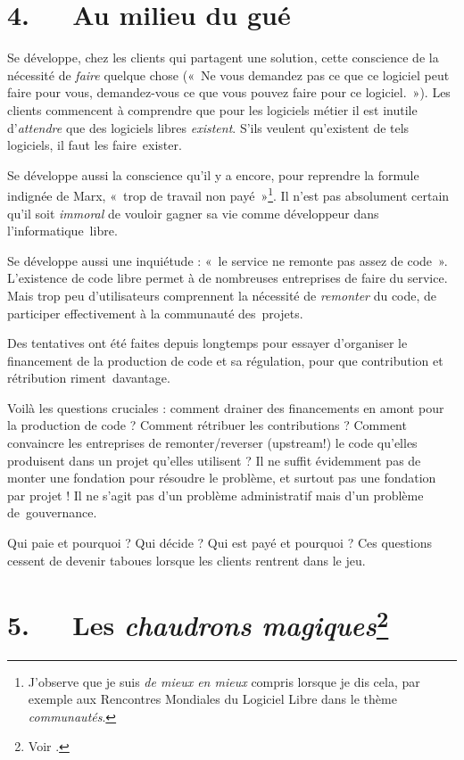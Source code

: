 \documentclass{FramateX}
\begin{document}
\begin{refsection}
\section*{4.~~~Au milieu du gué}
{}

Se développe, chez les clients qui partagent une solution, cette
conscience de la nécessité de \textit{faire} quelque chose («~Ne vous
demandez pas ce que ce logiciel peut faire pour vous, demandez-vous ce
que vous pouvez faire pour ce logiciel.~»). Les clients commencent à
comprendre que pour les logiciels métier il est inutile
d'\textit{attendre} que des logiciels libres \textit{existent}. S'ils
veulent qu'existent de tels logiciels, il faut les faire~exister. 

Se développe aussi la conscience qu'il y a encore, pour reprendre la
formule indignée de Marx, «~trop de travail non
payé~»\footnote{J'observe que je suis \textit{de mieux en mieux}
compris lorsque je dis cela, par exemple aux Rencontres Mondiales du
Logiciel Libre dans le thème \textit{communautés}. }. Il n'est pas
absolument certain qu'il soit \textit{immoral} de vouloir gagner sa vie
comme développeur dans l'informatique~libre. 

Se développe aussi une inquiétude : «~le service ne remonte pas assez de
code~». L'existence de code libre permet à de nombreuses entreprises de
faire du service. Mais trop peu d'utilisateurs comprennent la nécessité
de \textit{remonter} du code, de participer effectivement à la
communauté des~projets.

Des tentatives ont été faites depuis longtemps pour essayer d'organiser
le financement de la production de code et sa régulation, pour que
contribution et rétribution riment~davantage.

Voilà les questions cruciales : comment drainer des financements en
amont pour la production de code ? Comment rétribuer les contributions
? Comment convaincre les entreprises de remonter/reverser (upstream!)
le code qu'elles produisent dans un projet qu'elles utilisent ? Il ne
suffit évidemment pas de monter une fondation pour résoudre le
problème, et surtout pas une fondation par projet ! Il ne s'agit pas
d'un problème administratif mais d'un problème de~gouvernance. 

Qui paie et pourquoi ? Qui décide ? Qui est payé et pourquoi ? Ces
questions cessent de devenir taboues lorsque les clients rentrent dans
le jeu.

\section*{5.~~~Les \textit{chaudrons magiques}\protect\footnote{Voir \cite{raymondchaudron1999}.}}
{}



\end{refsection}
\end{document}
